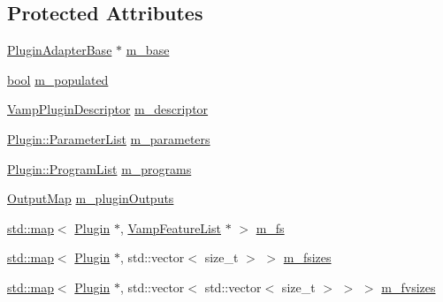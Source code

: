 \subsection*{Protected Attributes}
\begin{DoxyCompactItemize}
\item 
\hyperlink{class_vamp_1_1_plugin_adapter_base}{Plugin\+Adapter\+Base} $\ast$ \hyperlink{class_vamp_1_1_plugin_adapter_base_1_1_impl_ac0372df58956b4bf99a9ec070b11dea4}{m\+\_\+base}
\item 
\hyperlink{mac_2config_2i386_2lib-src_2libsoxr_2soxr-config_8h_abb452686968e48b67397da5f97445f5b}{bool} \hyperlink{class_vamp_1_1_plugin_adapter_base_1_1_impl_a93384198b121720dfa627dafe77839a6}{m\+\_\+populated}
\item 
\hyperlink{vamp_8h_aa1d6e0792099b9516a89b5fb7ed2ad2b}{Vamp\+Plugin\+Descriptor} \hyperlink{class_vamp_1_1_plugin_adapter_base_1_1_impl_aeeea6028dbc6b4b96f4351a5cb79abac}{m\+\_\+descriptor}
\item 
\hyperlink{class_vamp_1_1_plugin_base_a3b6bb4bbd86affe1ca9deceea1aad4f8}{Plugin\+::\+Parameter\+List} \hyperlink{class_vamp_1_1_plugin_adapter_base_1_1_impl_a0edebff94969c59cc651b4517bcc6bb9}{m\+\_\+parameters}
\item 
\hyperlink{class_vamp_1_1_plugin_base_a7f66f00437b21e5f694fe02356b12f20}{Plugin\+::\+Program\+List} \hyperlink{class_vamp_1_1_plugin_adapter_base_1_1_impl_a79666690394693c9e293a4e74960b444}{m\+\_\+programs}
\item 
\hyperlink{class_vamp_1_1_plugin_adapter_base_1_1_impl_afd448b66d5973d8e14ec592dabcbbd2d}{Output\+Map} \hyperlink{class_vamp_1_1_plugin_adapter_base_1_1_impl_a193241eba6e9bcd3d4482c5f646d3822}{m\+\_\+plugin\+Outputs}
\item 
\hyperlink{xllist_8c_a03a3bd19ed9a28af3660a6c7b77249c2}{std\+::map}$<$ \hyperlink{class_vamp_1_1_plugin}{Plugin} $\ast$, \hyperlink{vamp_8h_a5f257e3f8b5ca1ca4c159d486e219078}{Vamp\+Feature\+List} $\ast$ $>$ \hyperlink{class_vamp_1_1_plugin_adapter_base_1_1_impl_a4d3b0d23ae969d2895f13448d294455a}{m\+\_\+fs}
\item 
\hyperlink{xllist_8c_a03a3bd19ed9a28af3660a6c7b77249c2}{std\+::map}$<$ \hyperlink{class_vamp_1_1_plugin}{Plugin} $\ast$, std\+::vector$<$ size\+\_\+t $>$ $>$ \hyperlink{class_vamp_1_1_plugin_adapter_base_1_1_impl_aa9fa862a49d49fae2dc4b45bc23f5281}{m\+\_\+fsizes}
\item 
\hyperlink{xllist_8c_a03a3bd19ed9a28af3660a6c7b77249c2}{std\+::map}$<$ \hyperlink{class_vamp_1_1_plugin}{Plugin} $\ast$, std\+::vector$<$ std\+::vector$<$ size\+\_\+t $>$ $>$ $>$ \hyperlink{class_vamp_1_1_plugin_adapter_base_1_1_impl_a166ff8e5df4fcd27f74bc7179e14c33e}{m\+\_\+fvsizes}
\end{DoxyCompactItemize}
